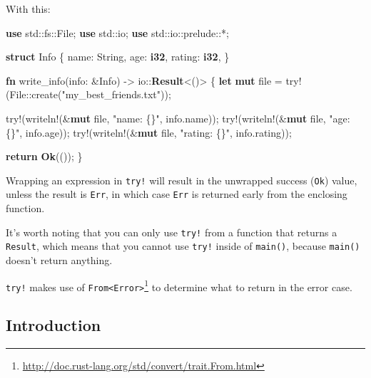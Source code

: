 \documentclass[a4paper,]{book}
\newenvironment{Shaded}{\begin{snugshade}}{\end{snugshade}}
\newcommand{\KeywordTok}[1]{\textcolor[rgb]{0.13,0.29,0.53}{\textbf{{#1}}}}
\newcommand{\StringTok}[1]{\textcolor[rgb]{0.31,0.60,0.02}{{#1}}}
\newcommand{\OtherTok}[1]{\textcolor[rgb]{0.56,0.35,0.01}{{#1}}}
\newcommand{\NormalTok}[1]{{#1}}
\renewcommand{\href}[2]{#2\footnote{\url{#1}}}
\begin{document}
With this:

\begin{Shaded}
\begin{Highlighting}[]
\KeywordTok{use} \NormalTok{std::fs::File;}
\KeywordTok{use} \NormalTok{std::io;}
\KeywordTok{use} \NormalTok{std::io::prelude::*;}

\KeywordTok{struct} \NormalTok{Info \{}
    \NormalTok{name: String,}
    \NormalTok{age: }\KeywordTok{i32}\NormalTok{,}
    \NormalTok{rating: }\KeywordTok{i32}\NormalTok{,}
\NormalTok{\}}

\KeywordTok{fn} \NormalTok{write_info(info: &Info) -> io::}\KeywordTok{Result}\NormalTok{<()> \{}
    \KeywordTok{let} \KeywordTok{mut} \NormalTok{file = }\OtherTok{try!}\NormalTok{(File::create(}\StringTok{"my_best_friends.txt"}\NormalTok{));}

    \OtherTok{try!}\NormalTok{(}\OtherTok{writeln!}\NormalTok{(&}\KeywordTok{mut} \NormalTok{file, }\StringTok{"name: \{\}"}\NormalTok{, info.name));}
    \OtherTok{try!}\NormalTok{(}\OtherTok{writeln!}\NormalTok{(&}\KeywordTok{mut} \NormalTok{file, }\StringTok{"age: \{\}"}\NormalTok{, info.age));}
    \OtherTok{try!}\NormalTok{(}\OtherTok{writeln!}\NormalTok{(&}\KeywordTok{mut} \NormalTok{file, }\StringTok{"rating: \{\}"}\NormalTok{, info.rating));}

    \KeywordTok{return} \KeywordTok{Ok}\NormalTok{(());}
\NormalTok{\}}
\end{Highlighting}
\end{Shaded}

Wrapping an expression in \texttt{try!} will result in the unwrapped
success (\texttt{Ok}) value, unless the result is \texttt{Err}, in which
case \texttt{Err} is returned early from the enclosing function.

It's worth noting that you can only use \texttt{try!} from a function
that returns a \texttt{Result}, which means that you cannot use
\texttt{try!} inside of \texttt{main()}, because \texttt{main()} doesn't
return anything.

\texttt{try!} makes use of
\href{http://doc.rust-lang.org/std/convert/trait.From.html}{\texttt{From\textless{}Error\textgreater{}}}
to determine what to return in the error case.


\subsection{Introduction}\label{introduction-1}
\end{document}
